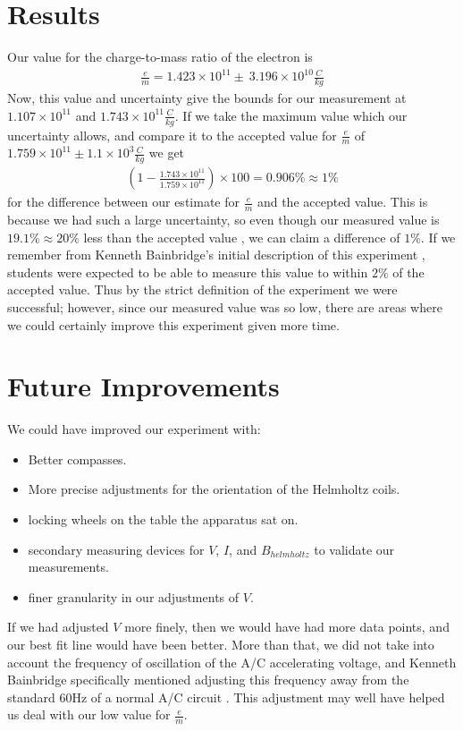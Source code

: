 \documentclass[aps,twocolumn,secnumarabic,amsmath,amssymb,nofootinbib]{revtex4-1}
\begin{document}
\section{Results}

Our value for the charge-to-mass ratio of the electron is
\begin{align*}
	\frac{e}{m} = 1.423 \times 10^{11} \pm \ 3.196 \times 10^{10} \frac{C}{kg}
\end{align*}
Now, this value and uncertainty give the bounds for our measurement at $1.107 \times 10^{11}$ and $1.743 \times 10^{11} \frac{C}{kg}$. If we take the maximum value which our uncertainty allows, and compare it to the accepted value for $\frac{e}{m}$ of $1.759\times10^{11} \pm 1.1\times10^3 \frac{C}{kg}$ \cite{value} we get 
\begin{align*}
	\left(1 - \frac{1.743 \times 10^{11}}{1.759\times10^{11}}\right) \times 100 = 0.906\% \approx 1\%
\end{align*}
for the difference between our estimate for $\frac{e}{m}$ and the accepted value. This is because we had such a large uncertainty, so even though our measured value is $19.1\% \approx 20\%$ less than the accepted value \cite{value}, we can claim a difference of $1\%$. If we remember from Kenneth Bainbridge's initial description of this experiment \cite{origin}, students were expected to be able to measure this value to within $2\%$ of the accepted value. Thus by the strict definition of the experiment we were successful; however, since our measured value was so low, there are areas where we could certainly improve this experiment given more time.


\section{Future Improvements}

We could have improved our experiment with:
\begin{itemize}[label={-}, noitemsep]
	\item Better compasses.
	\item More precise adjustments for the orientation of the Helmholtz coils.
	\item locking wheels on the table the apparatus sat on.
	\item secondary measuring devices for $V$, $I$, and $B_{helmholtz}$ to validate our measurements.
	\item finer granularity in our adjustments of $V$.
\end{itemize}
If we had adjusted $V$ more finely, then we would have had more data points, and our best fit line would have been better. More than that, we did not take into account the frequency of oscillation of the A/C accelerating voltage, and Kenneth Bainbridge specifically mentioned adjusting this frequency away from the standard 60Hz of a normal A/C circuit \cite{origin}. This adjustment may well have helped us deal with our low value for $\frac{e}{m}$. 
\end{document}
